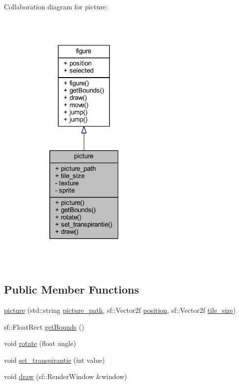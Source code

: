 Collaboration diagram for picture\+:
\nopagebreak
\begin{figure}[H]
\begin{center}
\leavevmode
\includegraphics[width=184pt]{classpicture__coll__graph}
\end{center}
\end{figure}
\subsection*{Public Member Functions}
\begin{DoxyCompactItemize}
\item 
\hyperlink{classpicture_af52694740d10d5bad731e3cce8c1dd1a}{picture} (std\+::string \hyperlink{classpicture_ab294409095c573549bdc79f9e6d31024}{picture\+\_\+path}, sf\+::\+Vector2f \hyperlink{classfigure_a2196c51490b69027860fdb015913de19}{position}, sf\+::\+Vector2f \hyperlink{classpicture_adff8f66e606a6c2e9a8f8b76d4ced587}{tile\+\_\+size})
\item 
sf\+::\+Float\+Rect \hyperlink{classpicture_a3a23c2ae495660c218f6f4e40e7e61cc}{get\+Bounds} ()
\item 
void \hyperlink{classpicture_a98bd5bdea80247573c1b155a5df5bea2}{rotate} (float angle)
\item 
void \hyperlink{classpicture_a4222d8d8a5be3d0775b741049064714f}{set\+\_\+transpirantie} (int value)
\item 
void \hyperlink{classpicture_ac69e8047651291091abbe2a8da545aa1}{draw} (sf\+::\+Render\+Window \&window)
\end{DoxyCompactItemize}
